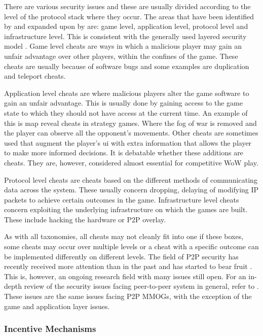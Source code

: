 \documentclass[10pt,a4paper,journal,cspaper,compsoc]{IEEEtran}
\begin{document}
There are various security issues and these are usually divided according to the level of the protocol stack where they occur. The areas that have
been identified by \cite{cheat_proof_event_ordering} and expanded upon by \cite{cheating_taxonomy} are: game level, application level, protocol level
and infrastructure level. This is consistent with the generally used layered security model \cite{distributed_systems_security}. Game level cheats
are ways in which a malicious player may gain an unfair advantage over other players, within the confines of the game. These cheats are usually
because of software bugs and some examples are duplication and teleport cheats.

Application level cheats are where malicious players alter the game software to gain an unfair advantage. This is usually done by gaining access to
the game state to which they should not have access at the current time. An example of this is map reveal cheats in strategy games. Where the fog of
war is removed and the player can observe all the opponent's movements. Other cheats are sometimes used that augment the player's \ac{ui} with extra
information that allows the player to make more informed decisions. It is debatable whether these additions are cheats. They are, however, considered
almost essential for competitive \ac{WoW} play.

Protocol level cheats are cheats based on the different methods of communicating data across the system. These usually concern dropping, delaying of
modifying IP packets to achieve certain outcomes in the game. Infrastructure level cheats concern exploiting the underlying infrastructure on which
the games are built. These include hacking the hardware or P2P overlay.

As with all taxonomies, all cheats may not cleanly fit into one if these boxes, some cheats may occur over multiple levels or a cheat with a specific
outcome can be implemented differently on different levels. The field of P2P security has recently received more attention than in the past and has
started to bear fruit \cite{survey_p2p_game_cheats}. This is, however, an ongoing research field with many issues still open. For an in-depth review
of the security issues facing peer-to-peer system in general, refer to \cite{p2p_security_issues}. These issues are the same issues facing P2P MMOGs,
with the exception of the game and application layer issues.

\subsubsection{Incentive Mechanisms}
\end{document}
